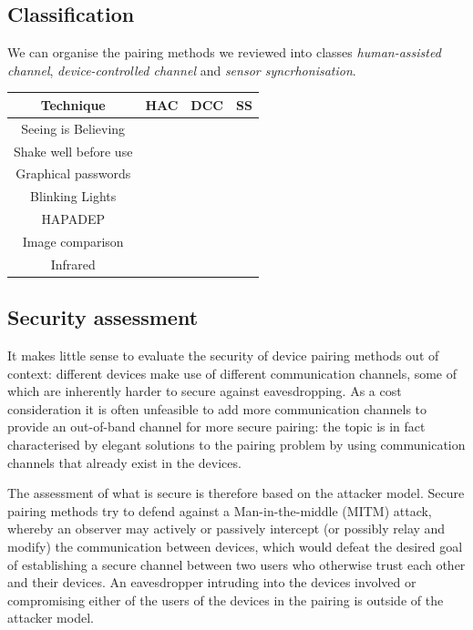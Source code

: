 \documentclass[conference, 11pt]{sty/IEEEtran}
\begin{document}
\subsection{Classification}
We can organise the pairing methods we reviewed into classes \emph{human-assisted channel}, \emph{device-controlled channel} and \emph{sensor syncrhonisation}.

\begin{tabular}{c|c|c|c}
	Technique & HAC & DCC & SS \\
	\hline
	  Seeing is Believing &  & \checkmark &   \\
	Shake well before use &  &  & \checkmark \\
    	  Graphical passwords & \checkmark &  &  \\
	   Blinking Lights & \checkmark &  & \\
	 HAPADEP &  & \checkmark & \checkmark \\
	Image comparison & \checkmark &  & \\
	Infrared &  & \checkmark &  \\
\end{tabular}

\subsection{Security assessment}
\label{ssec:security_assessment}

It makes little sense to evaluate the security of device pairing methods out of context: different devices make use of different communication channels, some of which are inherently harder to secure against eavesdropping.
As a cost consideration it is often unfeasible to add more communication channels to provide an out-of-band channel for more secure pairing: the topic is in fact characterised by elegant solutions to the pairing problem by using communication channels that already exist in the devices.

The assessment of what is secure is therefore based on the attacker model.
Secure pairing methods try to defend against a Man-in-the-middle (MITM) attack, whereby an observer may actively or passively intercept (or possibly relay and modify) the communication between devices, which would defeat the desired goal of establishing a secure channel between two users who otherwise trust each other and their devices.
An eavesdropper intruding into the devices involved or compromising either of the users of the devices in the pairing is outside of the attacker model.
\end{document}
